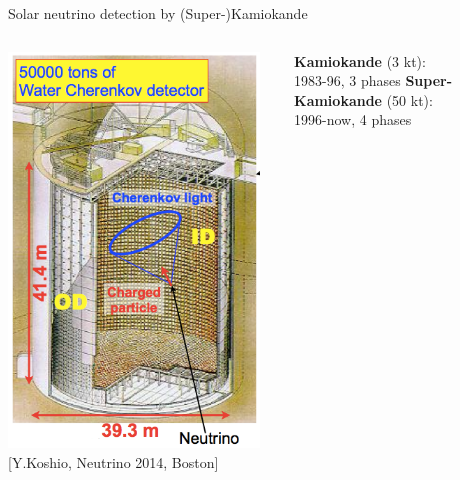 \begin{frame}[t]{Solar neutrino detection by (Super-)Kamiokande}
\begin{columns}
  \begin{column}{0.40\textwidth}
     \includegraphics[width=0.95\textwidth]{./images/3nu/solar/sk_schematic.png}\\
     {\scriptsize \color{blue}[Y.Koshio, Neutrino 2014, Boston]}
  \end{column}
  \begin{column}{0.30\textwidth}
     {\scriptsize
      {\bf Kamiokande} (3 kt):\\
         1983-96, 3 phases
      {\bf Super-Kamiokande} (50 kt):\\
         1996-now, 4 phases\\
         \vspace{0.1cm}
     }

\end{column}
\end{columns}
\end{frame}
